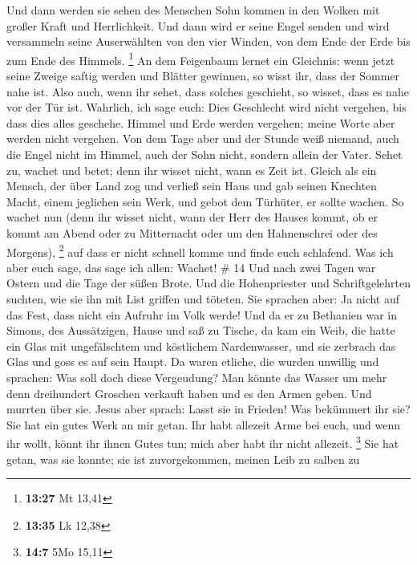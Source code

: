  Und dann werden sie sehen des Menschen Sohn kommen in
den Wolken mit großer Kraft und Herrlichkeit.  Und dann
wird er seine Engel senden und wird versammeln seine Auserwählten von
den vier Winden, von dem Ende der Erde bis zum Ende des Himmels.
\footnote{\textbf{13:27} Mt 13,41}  An dem Feigenbaum
lernet ein Gleichnis: wenn jetzt seine Zweige saftig werden und Blätter
gewinnen, so wisst ihr, dass der Sommer nahe ist.  Also
auch, wenn ihr sehet, dass solches geschieht, so wisset, dass es nahe
vor der Tür ist.  Wahrlich, ich sage euch: Dies
Geschlecht wird nicht vergehen, bis dass dies alles geschehe.
 Himmel und Erde werden vergehen; meine Worte aber werden
nicht vergehen.  Von dem Tage aber und der Stunde weiß
niemand, auch die Engel nicht im Himmel, auch der Sohn nicht, sondern
allein der Vater.  Sehet zu, wachet und betet; denn ihr
wisset nicht, wann es Zeit ist.  Gleich als ein Mensch,
der über Land zog und verließ sein Haus und gab seinen Knechten Macht,
einem jeglichen sein Werk, und gebot dem Türhüter, er sollte wachen.
 So wachet nun (denn ihr wisset nicht, wann der Herr des
Hauses kommt, ob er kommt am Abend oder zu Mitternacht oder um den
Hahnenschrei oder des Morgens), \footnote{\textbf{13:35} Lk 12,38}
 auf dass er nicht schnell komme und finde euch
schlafend.  Was ich aber euch sage, das sage ich allen:
Wachet! \# 14  Und nach zwei Tagen war Ostern und die Tage
der süßen Brote. Und die Hohenpriester und Schriftgelehrten suchten, wie
sie ihn mit List griffen und töteten.  Sie sprachen aber:
Ja nicht auf das Fest, dass nicht ein Aufruhr im Volk werde!
 Und da er zu Bethanien war in Simons, des Aussätzigen,
Hause und saß zu Tische, da kam ein Weib, die hatte ein Glas mit
ungefälschtem und köstlichem Nardenwasser, und sie zerbrach das Glas und
goss es auf sein Haupt.  Da waren etliche, die wurden
unwillig und sprachen: Was soll doch diese Vergeudung? 
Man könnte das Wasser um mehr denn dreihundert Groschen verkauft haben
und es den Armen geben. Und murrten über sie.  Jesus aber
sprach: Lasst sie in Frieden! Was bekümmert ihr sie? Sie hat ein gutes
Werk an mir getan.  Ihr habt allezeit Arme bei euch, und
wenn ihr wollt, könnt ihr ihnen Gutes tun; mich aber habt ihr nicht
allezeit. \footnote{\textbf{14:7} 5Mo 15,11}  Sie hat
getan, was sie konnte; sie ist zuvorgekommen, meinen Leib zu salben zu
